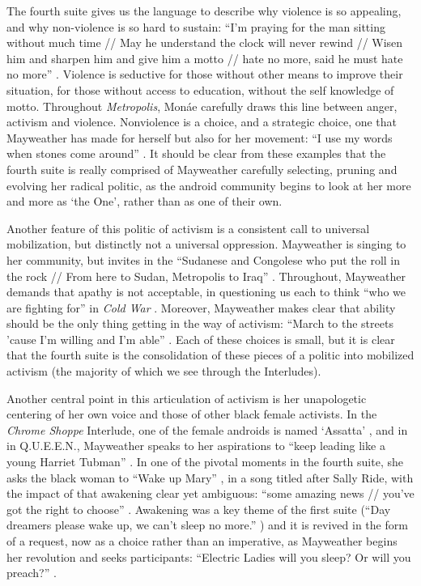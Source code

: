\documentclass[a4paper, 11pt]{article} %
\begin{document}
The fourth suite gives us the language to describe why violence is so appealing, and why non-violence is so hard to sustain:
``I'm praying for the man sitting without much time // May he understand the clock will never rewind // Wisen him and sharpen him and give him a motto // hate no more, said he must hate no more'' .
Violence is seductive for those without other means to improve their situation, for those without access to education, without the self knowledge of motto.
Throughout \emph{Metropolis}, Mon\'ae carefully draws this line between anger, activism and violence.
Nonviolence is a choice, and a strategic choice, one that Mayweather has made for herself  but also for her movement: ``I use my words when stones come around'' .
It should be clear from these examples that the fourth suite is really comprised of Mayweather carefully selecting, pruning and evolving her radical politic, as the android community begins to look at her more and more as `the One', rather than as one of their own.

Another feature of this politic of activism is a consistent call to universal mobilization, but distinctly not a universal oppression.
Mayweather is singing to her community, but invites in the 
``Sudanese and Congolese who put the roll in the rock // From here to Sudan, Metropolis to Iraq'' .
Throughout, Mayweather demands that apathy is not acceptable, in questioning us each to think ``who we are fighting for'' in \emph{Cold War} .
Moreover, Mayweather makes clear that ability should be the only thing getting in the way of activism: 
``March to the streets 'cause I'm willing and I'm able'' .
Each of these choices is small, but it is clear that the fourth suite is the consolidation of these pieces of a politic into mobilized activism (the majority of which we see through the Interludes).

Another central point in this articulation of activism is her unapologetic centering of her own voice and those of other black female activists.
In the \emph{Chrome Shoppe} Interlude, one of the female androids is named `Assatta' , and in in Q.U.E.E.N., Mayweather speaks to her aspirations to ``keep leading like a young Harriet Tubman'' .
In one of the pivotal moments in the fourth suite, she asks the black woman to ``Wake up Mary'' , in a song titled after Sally Ride, with the impact of that awakening clear yet ambiguous: ``some amazing news // you've got the right to choose'' . 
Awakening was a key theme of the first suite (``Day dreamers please wake up, we can't sleep no more.'' ) and it is revived in the form of a request, now as a choice rather than an imperative, as Mayweather begins her revolution and seeks participants: ``Electric Ladies will you sleep? Or will you preach?'' .
\end{document}
